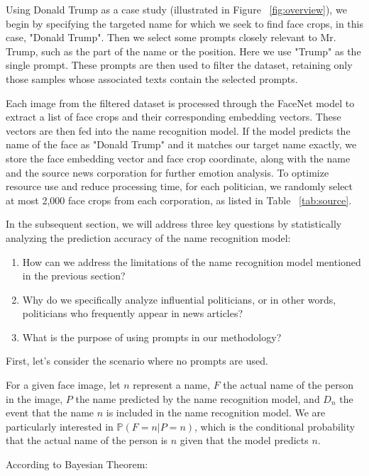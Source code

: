 \documentclass[sigconf]{acmart}
\newcommand{\Prob}[1]{\mathbb{P}\left(#1\right)}
\begin{document}
Using Donald Trump as a case study (illustrated in Figure ~\ref{fig:overview}), we begin by specifying the targeted name for which we seek to find face crops, in this case, "Donald Trump". Then we select some prompts closely relevant to Mr. Trump, such as the part of the name or the position. Here we use "Trump" as the single prompt. These prompts are then used to filter the dataset, retaining only those samples whose associated texts contain the selected prompts.

Each image from the filtered dataset is processed through the FaceNet model to extract a list of face crops and their corresponding embedding vectors. These vectors are then fed into the name recognition model. If the model predicts the name of the face as "Donald Trump" and it matches our target name exactly, we store the face embedding vector and face crop coordinate, along with the name and the source news corporation for further emotion analysis. To optimize resource use and reduce processing time, for each politician, we randomly select at most 2,000 face crops from each corporation, as listed in Table ~\ref{tab:source}.

In the subsequent section, we will address three key questions by statistically analyzing the prediction accuracy of the name recognition model:

\begin{enumerate}
\item How can we address the limitations of the name recognition model mentioned in the previous section?
\item Why do we specifically analyze influential politicians, or in other words, politicians who frequently appear in news articles?
\item What is the purpose of using prompts in our methodology?
\end{enumerate}

First, let's consider the scenario where no prompts are used.

For a given face image, let \( n \) represent a name, \( F \) the actual name of the person in the image, \( P \) the name predicted by the name recognition model, and \( D_n \) the event that the name \( n \) is included in the name recognition model. We are particularly interested in \( \Prob{F = n | P = n} \), which is the conditional probability that the actual name of the person is \( n \) given that the model predicts \( n \).

According to Bayesian Theorem:
\end{document}
